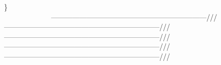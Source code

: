\} ~\newline
~\newline
~\newline
~\newline
~\newline
~\newline
~\newline
~\newline
~\newline
~\newline
~\newline
~\newline
~\newline
~\newline
~\newline
~\newline
~\newline
~\newline
~\newline
~\newline
~\newline
~\newline
~\newline
~\newline
~\newline
~\newline
~\newline
~\newline
~\newline
~\newline
~\newline
~\newline
~\newline
~\newline
~\newline
~\newline
~\newline
~\newline
~\newline
~\newline
~\newline
~\newline
~\newline
~\newline
~\newline
~\newline
~\newline
~\newline
~\newline
~\newline
 ------------------------------------------------------------------/// ------------------------------------------------------------------/// ------------------------------------------------------------------/// ------------------------------------------------------------------/// ------------------------------------------------------------------/// ~\newline
